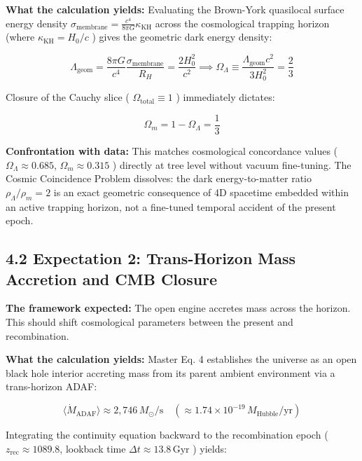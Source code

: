 \documentclass[11pt,a4paper]{article}
\theoremstyle{definition}\newtheorem{definition}{Definition}
\theoremstyle{remark}\newtheorem{remark}{Remark}
\begin{document}
\textbf{What the calculation yields:} Evaluating the Brown-York quasilocal surface energy density $\sigma_{\text{membrane}} = \frac{c^4}{8\pi G}\kappa_{\text{KH}}$ across the cosmological trapping horizon (where $\kappa_{\text{KH}} = H_0/c$ ) gives the geometric dark energy density:


\begin{equation}
\Lambda_{\text{geom}} = \frac{8\pi G}{c^4} \frac{\sigma_{\text{membrane}}}{R_H} = \frac{2 H_0^2}{c^2} \implies \Omega_\Lambda \equiv \frac{\Lambda_{\text{geom}} c^2}{3 H_0^2} = \frac{2}{3}
\end{equation}


Closure of the Cauchy slice ( $\Omega_{\text{total}} \equiv 1$ ) immediately dictates:


\begin{equation}
\Omega_m = 1 - \Omega_\Lambda = \frac{1}{3}
\end{equation}


\textbf{Confrontation with data:} This matches cosmological concordance values ( $\Omega_\Lambda \approx 0.685$, $\Omega_m \approx 0.315$ ) directly at tree level without vacuum fine-tuning. The Cosmic Coincidence Problem dissolves: the dark energy-to-matter ratio $\rho_\Lambda / \rho_m = 2$ is an exact geometric consequence of 4D spacetime embedded within an active trapping horizon, not a fine-tuned temporal accident of the present epoch.
\subsection{4.2 Expectation 2: Trans-Horizon Mass Accretion and CMB Closure}

\textbf{The framework expected:} The open engine accretes mass across the horizon. This should shift cosmological parameters between the present and recombination.

\textbf{What the calculation yields:} Master Eq. 4 establishes the universe as an open black hole interior accreting mass from its parent ambient environment via a trans-horizon ADAF:


\begin{equation}
\langle \dot{M}_{\text{ADAF}} \rangle \approx 2{,}746 \, M_\odot/\text{s} \quad (\approx 1.74 \times 10^{-19} \, M_{\text{Hubble}}/\text{yr})
\end{equation}


Integrating the continuity equation backward to the recombination epoch ( $z_{\text{rec}} \approx 1089.8$, lookback time $\Delta t \approx 13.8 \, \mathrm{Gyr}$ ) yields:
\end{document}

